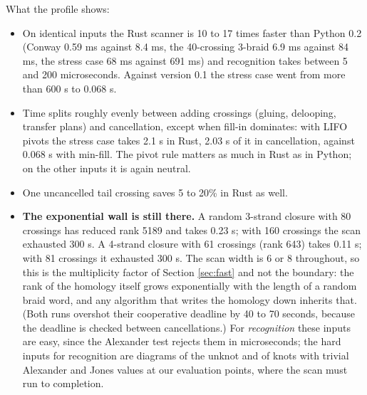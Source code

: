 \begin{center}\small
{}
\end{center}

What the profile shows:
\begin{itemize}
\item On identical inputs the Rust scanner is 10 to 17 times faster than
  Python 0.2 (Conway 0.59 ms against 8.4 ms, the 40-crossing 3-braid 6.9 ms
  against 84 ms, the stress case 68 ms against 691 ms) and recognition takes
  between 5 and 200 microseconds. Against version 0.1 the stress case went from
  more than 600 s to 0.068 s.
\item Time splits roughly evenly between adding crossings (gluing, delooping,
  transfer plans) and cancellation, except when fill-in dominates: with LIFO
  pivots the stress case takes 2.1 s in Rust, 2.03 s of it in cancellation,
  against 0.068 s with min-fill. The pivot rule matters as much in Rust as in
  Python; on the other inputs it is again neutral.
\item One uncancelled tail crossing saves 5 to 20\% in Rust as well.
\item \textbf{The exponential wall is still there.} A random 3-strand closure
  with 80 crossings has reduced rank 5189 and takes 0.23 s; with 160 crossings
  the scan exhausted 300 s. A 4-strand closure with 61 crossings (rank 643)
  takes 0.11 s; with 81 crossings it exhausted 300 s. The scan width is 6 or
  8 throughout, so this is the multiplicity factor of Section \ref{sec:fast}
  and not the boundary: the rank of the homology itself grows exponentially
  with the length of a random braid word, and any algorithm that writes the
  homology down inherits that. (Both runs overshot their cooperative deadline
  by 40 to 70 seconds, because the deadline is checked between cancellations.)
  For \emph{recognition} these inputs are easy, since the Alexander test
  rejects them in microseconds; the hard inputs for recognition are diagrams
  of the unknot and of knots with trivial Alexander and Jones values at our
  evaluation points, where the scan must run to completion.
\end{itemize}

